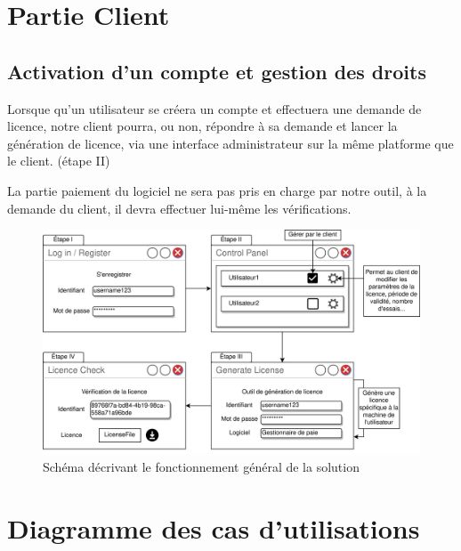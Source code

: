 \section{Partie Client}

\subsection{Activation d'un compte et gestion des droits}

Lorsque qu'un utilisateur se créera un compte et effectuera une demande de licence, notre client pourra, ou non, répondre à sa demande et lancer la génération de licence, via une interface administrateur sur la même platforme que le client. (étape II)

La partie paiement du logiciel ne sera pas pris en charge par notre outil, à la demande du client,
il devra effectuer lui-même les vérifications.
\newpage

\begin{figure}[h]
	\centering
	\vspace{4cm}
	\includegraphics[width=18cm]{main/png/STB.png}
	\caption{Schéma décrivant le fonctionnement général de la solution}
	\label{fig:fig1}
\end{figure}

\newpage

\section{Diagramme des cas d'utilisations}

